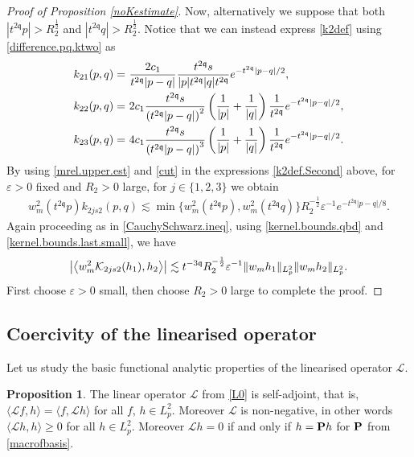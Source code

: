 \documentclass[reqno]{amsart}
\newcommand{\pv}{p}
\newcommand{\pZ}{|\pv|}
\newcommand{\qv}{q}
\newcommand{\qZ}{|\qv|}
\newcommand{\irnp}[2]{\left\langle {#1},{#2} \right\rangle}
\newcommand{\qq}{\mathfrak{q}}
\newcommand{\tqq}{t^{2\qq}}
\newcommand{\tmTq}{t^{-3\qq}}
\newcommand{\compK}{\mathcal{K}}
\newcommand{\linL}{\mathcal{L}}
\newcommand{\smep}{\varepsilon}
\theoremstyle{definition}
\newtheorem{proposition}[theorem]{Proposition}
\numberwithin{equation}{section}
\numberwithin{theorem}{section}
\begin{document}
\begin{proof}[Proof of Proposition \ref{noKestimate}]
Now, alternatively we suppose that both $ |\tqq\pv| > R_2^{\frac12}$ and $|\tqq \qv| > R_2^{\frac12}$. Notice that we can instead express \eqref{k2def} using \eqref{difference.pq.ktwo} as
\begin{align}\notag
k_{21}(p,q)= &~
\frac{2c_1}{\tqq|p-q|}\frac{\tqq s}{{\pZ}\tqq{\qZ}\tqq}
 e^{- \tqq|p-q|/2},
 \\ \label{k2def.Second}
 k_{22}(p,q)= &~
2c_1
\frac{\tqq s}{\left(\tqq|p-q|\right)^2}
\left(\frac{1}{{\pZ}}+\frac{1}{{\qZ}} \right)\frac{1}{\tqq}
 e^{- \tqq|p-q|/2},
 \\ \notag
  k_{23}(p,q)= &~
4c_1
\frac{\tqq s}{\left(\tqq|p-q|\right)^3}
\left(\frac{1}{{\pZ}}+\frac{1}{{\qZ}} \right)\frac{1}{\tqq}
 e^{- \tqq|p-q|/2}.
\end{align}
By using \eqref{mrel.upper.est} and \eqref{cut} in the expressions \eqref{k2def.Second} above, for $\smep>0$ fixed and $R_2>0$ large, for $j \in \{1, 2, 3\}$ we obtain
\begin{align}\label{kernel.bounds.last.small}
  w_{m}^2(\tqq \pv)  k_{2js2}(p,q)  
    \lesssim  
    \min\big\{w_{m}^2(\tqq \pv), w_{m}^2(\tqq \qv)\big\}
    R_2^{-\frac12} \smep^{-1} {e^{- \tqq|p-q|/8}}.
\end{align}
Again proceeding as in \eqref{CauchySchwarz.ineq}, using \eqref{kernel.bounds.qbd} and \eqref{kernel.bounds.last.small}, we have
\begin{align}\notag
\left|
 \irnp{w_{m}^2 \compK_{2js2}(h_1)}{h_2} 
\right|
\lesssim   
\tmTq R_2^{-\frac12} \smep^{-1} \| w_{m} h_1\|_{L^2_p}
 \|  w_{m} h_2\|_{L^2_p}.
\end{align}
First choose $\smep>0$ small, then choose $R_2>0$ large to complete the proof.
\end{proof}


\subsection{Coercivity of the linearised operator}\label{seccoerciveestima}

Let us study the basic functional analytic properties of the linearised operator $\linL$.

\begin{proposition}
    The linear operator $\linL$ from \eqref{L0} is self-adjoint, that is, $\langle \linL f,h\rangle =\langle  f,\linL h\rangle$ for all \(f\), \(h\in L^2_p\). Moreover $\linL$ is non-negative, in other words $\langle\linL h,h\rangle \ge 0$ for all \(h\in L^2_p\). Moreover $\linL h = 0$ if and only if $h = {\bf P} h$ for ${\bf P}$ from \eqref{macrofbasis}.  
\end{proposition}
\end{document}
